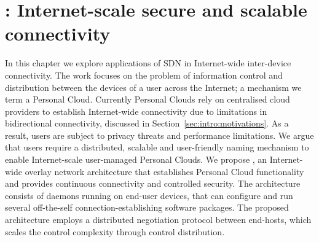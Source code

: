 \chapter{\signpost: Internet-scale secure and scalable connectivity}
\label{sec:signpost}
\ifpdf
    \graphicspath{{Chapter3/Chapter3Figs/PNG/}{Chapter3/Chapter3Figs/PDF/}{Chapter3/Chapter3Figs/}}
\else
    \graphicspath{{Chapter3/Chapter3Figs/EPS/}{Chapter3/Chapter3Figs/}}
\fi


In this chapter we explore applications of SDN in Internet-wide inter-device
connectivity.  The work focuses on the problem of information control and
distribution between the devices of a user across the Internet; a mechanism we
term a Personal Cloud.  Currently Personal Clouds rely on centralised cloud
providers to establish Internet-wide connectivity due to limitations in
bidirectional connectivity, discussed in Section~\ref{sec:intro:motivations}. As
a result, users are subject to privacy threats and performance limitations. We
argue that users require a distributed, scalable and user-friendly naming
mechanism to enable Internet-scale user-managed Personal Clouds.  We propose
\signpost, an Internet-wide overlay network architecture that establishes
Personal Cloud functionality and provides continuous connectivity and controlled
security. The architecture consists of daemons running on end-user devices, that
can configure and run several off-the-self connection-establishing software
packages.  The proposed architecture employs a distributed negotiation protocol
between end-hosts, which scales the control complexity through control
distribution.


